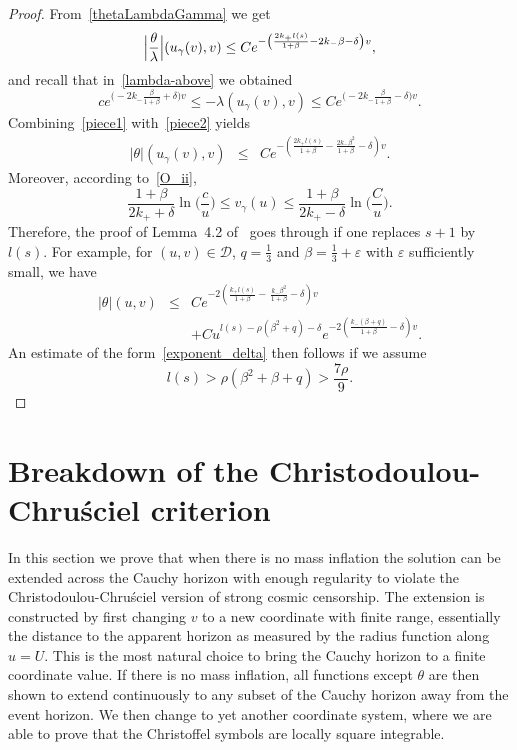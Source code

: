 \documentclass[a4paper,11pt,oneside,reqno]{amsart}
\newcommand{\kk}{k_+}
\newcommand{\kkk}{k_-}
\newcommand{\cal}{\mathcal}
\renewcommand{\Psi}{\rho}
\newcommand{\eps}{\varepsilon}
\newcommand{\gam}{\gamma}
\newcommand{\ugam}{u_{\gam}}
\newcommand{\vgam}{v_{\gam}}
\begin{document}
\begin{proof}
From~\eqref{thetaLambdaGamma} we get
\begin{equation} 
\Bigl|\frac\theta\lambda\Bigr|(u_\gamma(v),v)
\leq Ce^{-\left(\frac{2\kk l(s)}{1+\beta}-
2\kkk \beta-\delta\right)v},\label{piece1}
\end{equation}
and recall that in~\eqref{lambda-above} we obtained
\begin{equation} 
 ce^{\bigl(-2\kkk\frac\beta{1+\beta}+\delta\bigr)v}\leq
  -\lambda(u_\gamma(v),v)\leq
  Ce^{\bigl(-2\kkk\frac\beta{1+\beta}-\delta\bigr)v}.\label{piece2}
 \end{equation}
 Combining~\eqref{piece1} with~\eqref{piece2} yields
 \begin{eqnarray}
 |\theta|(\ugam(v),v)&\leq& Ce^{-\left(\frac{2\kk l(s)}{1+\beta}-\frac{2\kkk\beta^2}{1+\beta}-\delta\right)v}.\label{bbtheta}
 \end{eqnarray}
Moreover, according to~\eqref{O_ii},
\begin{equation*} 
\frac{1+\beta}{2\kk+\delta}\ln\Bigr(\frac cu\Bigr) \leq \vgam(u)\leq
\frac{1+\beta}{2\kk-\delta}\ln\Bigr(\frac Cu\Bigr).
\end{equation*}
Therefore, the proof of Lemma~4.2 of~\cite{relIst3} goes through if one replaces
$s+1$ by $l(s)$. For example, for $(u,v)\in{\cal D}$, $q=\frac{1}{3}$ and $\beta=\frac{1}{3}+\eps$
with $\eps$ sufficiently small, we have
\begin{eqnarray}
|\theta|(u,v)&\leq& Ce^{-2\left(\frac{k_+l(s)}{1+\beta}-\,\frac{k_-\beta^2}{1+\beta}-\delta\right)v}\nonumber\\
&&+Cu^{l(s)-\Psi(\beta^2+q)-\delta}e^{-2\left(\frac{k_-(\beta+q)}{1+\beta}-\delta\right)v}.\label{eq10}
\end{eqnarray}
An estimate of the form~\eqref{exponent_delta} then follows if we assume 
$$
l(s)>\Psi(\beta^2+\beta+q)>\frac{7\rho}{9}.
$$
\end{proof}

\section{Breakdown of the Christodoulou-Chru\'sciel criterion}\label{section11}

In this section we prove that when there is no mass inflation the solution can be extended across the Cauchy horizon with enough regularity to violate the Christodoulou-Chru\'sciel version of strong cosmic censorship. The extension is constructed by first changing $v$ to a new coordinate with finite range, essentially the distance to the apparent horizon as measured by the radius function along $u=U$. This is the most natural choice to bring the Cauchy horizon to a finite coordinate value. If there is no mass inflation, all functions except $\theta$ are then shown to extend continuously to any subset of the Cauchy horizon away from the event horizon. We then change to yet another coordinate system, where we are able to prove that the Christoffel symbols are locally square integrable.
\end{document}

